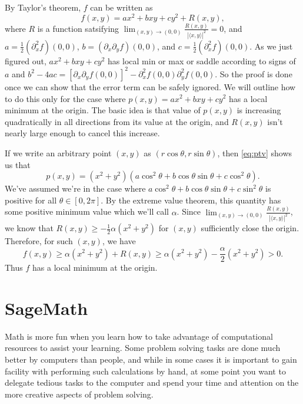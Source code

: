 \documentclass{watsonbook}
\begin{document}
\begin{pf}
      By Taylor's theorem, $f$ can be written as
      \[
        f(x,y) = ax^2 + bxy + cy^2 + R(x,y), 
      \]
    where $R$ is a function satsifying
    $\lim_{(x,y) \to (0,0)}\frac{R(x,y)}{|\langle x,y \rangle|^2} =
    0$, and $a = \tfrac{1}{2}(\partial_x^2f)(0,0)$,
    $b = (\partial_x\partial_y f)(0,0)$, and
    $c = \tfrac{1}{2}(\partial_x^2f)(0,0)$. As we just figured out,
    $ax^2 + bxy + cy^2$ has local min or max or saddle according to
    signs of $a$ and
    $b^2 - 4ac = [\partial_x\partial_y f(0,0)]^2 -
    \partial_x^2f(0,0)\partial_y^2 f(0,0)$. So the proof is done once
    we can show that the error term can be safely ignored. We will
    outline how to do this only for the case where
    $p(x,y) = ax^2 + bxy + cy^2$ has a local minimum at the
    origin. The basic idea is that value of $p(x,y)$ is increasing
    quadratically in all directions from its value at the origin, and
    $R(x,y)$ isn't nearly large enough to cancel this increase. 

    If we write an arbitrary point $(x,y)$ as
    $(r\cos \theta, r\sin \theta)$, then \eqref{eq:ptv} shows us that
    \[
      p(x,y) = (x^2+y^2)(a\cos^2 \theta + b \cos \theta \sin \theta +
      c \cos^2 \theta). 
    \]
    We've assumed we're in the case where
    $a\cos^2 \theta + b \cos \theta \sin \theta + c \sin^2 \theta$ is
    positive for all $\theta \in [0,2\pi]$. By the extreme value
    theorem, this quantity has some positive minimum value which we'll
    call $\alpha$.  Since
    $\lim_{(x,y) \to (0,0)}\frac{R(x,y)}{|\langle x,y \rangle|^2}$, we
    know that $R(x,y) \geq -\tfrac{1}{2}\alpha(x^2+y^2)$ for $(x,y)$
    sufficiently close the origin. Therefore, for such $(x,y)$, we
    have
    \[
      f(x,y)  \geq \alpha(x^2 + y^2) + R(x,y) \geq
      \alpha(x^2 + y^2) - \frac{\alpha}{2}(x^2+y^2) > 0.
    \]
    Thus $f$ has a local minimum at the origin. 
  \end{pf}

  \newpage 

  \section{SageMath} \label{sec:sagemath} 

  Math is more fun when you learn how to take advantage of
  computational resources to assist your learning. Some problem
  solving tasks are done much better by computers than people, and
  while in some cases it is important to gain facility with performing
  such calculations by hand, at some point you want to delegate
  tedious tasks to the computer and spend your time and attention on
  the more creative aspects of problem solving.
\end{document}
